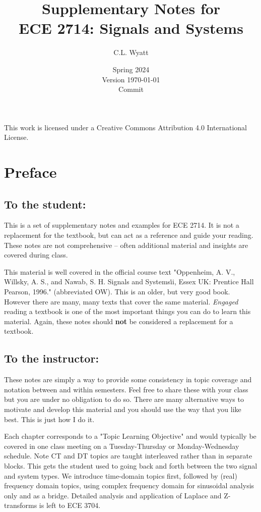 \documentclass[]{book}
\theoremstyle{definition}
\numberwithin{section}{chapter}
\numberwithin{equation}{chapter}
\begin{document}
\frontmatter

\title{Supplementary Notes for\\ ECE 2714: Signals and Systems}
\author{C.L. Wyatt}
\date{Spring 2024\\Version \today\\Commit \texttt{}}
\maketitle
This work is licensed under a Creative Commons Attribution 4.0 International License.

\chapter*{Preface}

\section*{To the student:}
This is a set of supplementary notes and examples for ECE 2714. It is not a replacement for the textbook, but can act as a reference and guide your reading. These notes are not comprehensive -- often additional material and insights are covered during class.

This material is well covered in the official course text "Oppenheim, A. V., Willsky, A. S., and Nawab, S. H. Signals and Systems\. ii, Essex UK: Prentice Hall Pearson, 1996." \cite{OW} (abbreviated OW). This is an older, but very good book. However there are many, many texts that cover the same material. \textit{Engaged} reading a textbook is one of the most important things you can do to learn this material. Again, these notes should \textbf{not} be considered a replacement for a textbook.

\section*{To the instructor:}
These notes are simply a way to provide some consistency in topic coverage and notation between and within semesters. Feel free to share these with your class but you are under no obligation to do so. There are many alternative ways to motivate and develop this material and you should use the way that you like best. This is just how I do it.

Each chapter corresponds to a "Topic Learning Objective" and would typically be covered in one class meeting on a Tuesday-Thursday or Monday-Wednesday schedule. Note CT and DT topics are taught interleaved rather than in separate blocks. This gets the student used to going back and forth between the two signal and system types. We introduce time-domain topics first, followed by (real) frequency domain topics, using complex frequency domain for sinusoidal analysis only and as a bridge. Detailed analysis and application of Laplace and Z-transforms is left to ECE 3704. 
\end{document}
